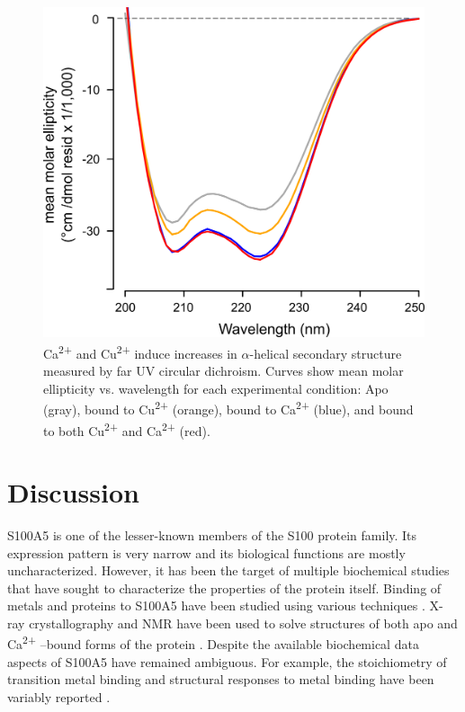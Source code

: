 \begin{figure}
\centering
	\includegraphics{ch4-fig4.png} 
\caption[Ca\textsuperscript{2+} and Cu\textsuperscript{2+} 
induce increases in $\alpha$-helical secondary structure\newline measured
by far UV circular dichroism]{Ca\textsuperscript{2+} and Cu\textsuperscript{2+} 
induce increases in $\alpha$-helical secondary structure measured
by far UV circular dichroism. Curves show mean molar ellipticity
vs. wavelength for each experimental condition: Apo (gray), bound
to Cu\textsuperscript{2+} (orange), bound to Ca\textsuperscript{2+} 
(blue), and bound to both Cu\textsuperscript{2+} and Ca\textsuperscript{2+} 
(red).\label{samplefigure}}	
\end{figure}

\section{Discussion}
S100A5 is one of the lesser-known members of the S100 protein family.
Its expression pattern is very narrow and its biological functions
are mostly uncharacterized. However, it has been the target of multiple
biochemical studies that have sought to characterize the properties
of the protein itself. Binding of metals and proteins to S100A5 have
been studied using various techniques \cite{schafer_brain_2000,wheeler_multiple_2016,bertini_solution_2009,cho_pentamidine_2016,kim_biophysical_2017}.
X-ray crystallography and NMR have been used to solve structures of
both apo and Ca\textsuperscript{2+} –bound forms of the protein \cite{bertini_solution_2009,liriano_protein_nodate}.
Despite the available biochemical data aspects of S100A5 have remained
ambiguous. For example, the stoichiometry of transition metal binding
and structural responses to metal binding have been variably reported
\cite{schafer_brain_2000,wheeler_multiple_2016}. 

